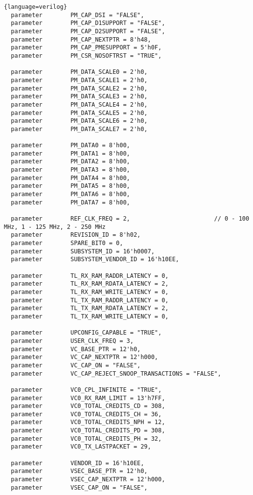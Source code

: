 \begin{lstlisting}{language=verilog}
  parameter        PM_CAP_DSI = "FALSE", 
  parameter        PM_CAP_D1SUPPORT = "FALSE", 
  parameter        PM_CAP_D2SUPPORT = "FALSE", 
  parameter        PM_CAP_NEXTPTR = 8'h48, 
  parameter        PM_CAP_PMESUPPORT = 5'h0F, 
  parameter        PM_CSR_NOSOFTRST = "TRUE", 

  parameter        PM_DATA_SCALE0 = 2'h0, 
  parameter        PM_DATA_SCALE1 = 2'h0, 
  parameter        PM_DATA_SCALE2 = 2'h0, 
  parameter        PM_DATA_SCALE3 = 2'h0, 
  parameter        PM_DATA_SCALE4 = 2'h0, 
  parameter        PM_DATA_SCALE5 = 2'h0, 
  parameter        PM_DATA_SCALE6 = 2'h0, 
  parameter        PM_DATA_SCALE7 = 2'h0, 

  parameter        PM_DATA0 = 8'h00, 
  parameter        PM_DATA1 = 8'h00, 
  parameter        PM_DATA2 = 8'h00, 
  parameter        PM_DATA3 = 8'h00, 
  parameter        PM_DATA4 = 8'h00, 
  parameter        PM_DATA5 = 8'h00, 
  parameter        PM_DATA6 = 8'h00, 
  parameter        PM_DATA7 = 8'h00, 

  parameter        REF_CLK_FREQ = 2,                        // 0 - 100 MHz, 1 - 125 MHz, 2 - 250 MHz  
  parameter        REVISION_ID = 8'h02, 
  parameter        SPARE_BIT0 = 0, 
  parameter        SUBSYSTEM_ID = 16'h0007, 
  parameter        SUBSYSTEM_VENDOR_ID = 16'h10EE, 

  parameter        TL_RX_RAM_RADDR_LATENCY = 0, 
  parameter        TL_RX_RAM_RDATA_LATENCY = 2, 
  parameter        TL_RX_RAM_WRITE_LATENCY = 0, 
  parameter        TL_TX_RAM_RADDR_LATENCY = 0, 
  parameter        TL_TX_RAM_RDATA_LATENCY = 2, 
  parameter        TL_TX_RAM_WRITE_LATENCY = 0, 

  parameter        UPCONFIG_CAPABLE = "TRUE", 
  parameter        USER_CLK_FREQ = 3, 
  parameter        VC_BASE_PTR = 12'h0, 
  parameter        VC_CAP_NEXTPTR = 12'h000, 
  parameter        VC_CAP_ON = "FALSE", 
  parameter        VC_CAP_REJECT_SNOOP_TRANSACTIONS = "FALSE", 

  parameter        VC0_CPL_INFINITE = "TRUE", 
  parameter        VC0_RX_RAM_LIMIT = 13'h7FF, 
  parameter        VC0_TOTAL_CREDITS_CD = 308, 
  parameter        VC0_TOTAL_CREDITS_CH = 36, 
  parameter        VC0_TOTAL_CREDITS_NPH = 12, 
  parameter        VC0_TOTAL_CREDITS_PD = 308, 
  parameter        VC0_TOTAL_CREDITS_PH = 32, 
  parameter        VC0_TX_LASTPACKET = 29, 

  parameter        VENDOR_ID = 16'h10EE, 
  parameter        VSEC_BASE_PTR = 12'h0, 
  parameter        VSEC_CAP_NEXTPTR = 12'h000, 
  parameter        VSEC_CAP_ON = "FALSE", 


\end{lstlisting}
